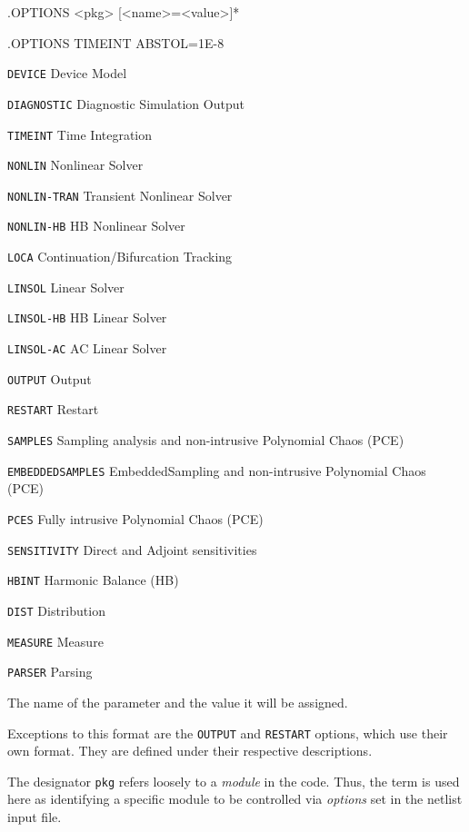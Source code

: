 \begin{Command}
\format
.OPTIONS <pkg> [<name>=<value>]*

\examples
.OPTIONS TIMEINT ABSTOL=1E-8

\arguments

\begin{Arguments}


\begin{basedescript}{
    \desclabelstyle{\multilinelabel}
    \desclabelwidth{1.5in}
    \renewcommand{\makelabel}[1]{\tt #1\hfill}}
  \item[\tt DEVICE]       Device Model
  \item[\tt DIAGNOSTIC]   Diagnostic Simulation Output
  \item[\tt TIMEINT]      Time Integration
  \item[\tt NONLIN]       Nonlinear Solver
  \item[\tt NONLIN-TRAN]  Transient Nonlinear Solver
  \item[\tt NONLIN-HB]    HB Nonlinear Solver
  \item[\tt LOCA]         Continuation/Bifurcation Tracking
  \item[\tt LINSOL]       Linear Solver
  \item[\tt LINSOL-HB]    HB Linear Solver
  \item[\tt LINSOL-AC]    AC Linear Solver
  \item[\tt OUTPUT]       Output
  \item[\tt RESTART]      Restart
  \item[\tt SAMPLES]      Sampling analysis and non-intrusive Polynomial Chaos (PCE)
  \item[\tt EMBEDDEDSAMPLES]  EmbeddedSampling and non-intrusive Polynomial Chaos (PCE) 
  \item[\tt PCES]         Fully intrusive Polynomial Chaos (PCE)
  \item[\tt SENSITIVITY]  Direct and Adjoint sensitivities
  \item[\tt HBINT]        Harmonic Balance (HB)
  \item[\tt DIST]         Distribution
  \item[\tt MEASURE]      Measure
  \item[\tt PARSER]       Parsing
\end{basedescript}

The name of the parameter and the value it will be assigned.

\end{Arguments}

\comments

Exceptions to this format are the \texttt{OUTPUT} and \texttt{RESTART}
options, which use their own format. They are defined under their
respective descriptions.

The designator \texttt{pkg} refers loosely to a {\em module} in the
code.  Thus, the term is used here as identifying a specific module to
be controlled via {\em options} set in the netlist input file.

\end{Command}

